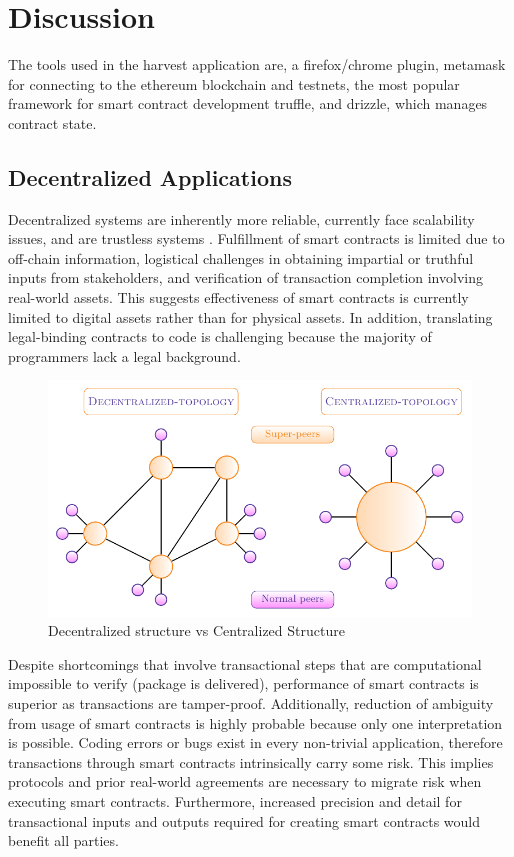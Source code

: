 \documentclass[12pt,tightenlines,letterpaper]{scrartcl}
\begin{document}
\newpage
\section{Discussion}
 	The tools used in the harvest application are, a firefox/chrome plugin, metamask for connecting to the ethereum blockchain and testnets, the most popular framework for smart contract development truffle, and drizzle, which manages contract state.
		\subsection{Decentralized Applications}
		
		
		Decentralized systems are inherently more reliable, currently face scalability issues, and are trustless systems \cite{bitcoinWhitePaper:Online,ethereumWhitePaper:Online}. Fulfillment of smart contracts is limited due to off-chain information, logistical challenges in obtaining impartial or truthful inputs from stakeholders, and verification of transaction completion involving real-world assets. This suggests effectiveness of smart contracts is currently limited to digital assets rather than for physical assets.  In addition, translating legal-binding contracts to code is challenging because the majority of programmers lack a legal background.
		
		\begin{figure}[H]
		\centering
		\includegraphics[width=0.7\linewidth]{DappVApp}
		\caption{Decentralized structure vs Centralized Structure}
		\label{fig:dappvapp}
		\end{figure}
		
		Despite shortcomings that involve transactional steps that are computational impossible to verify (package is delivered), performance of smart contracts is superior as transactions are tamper-proof.
		Additionally, reduction of ambiguity from usage of smart contracts is highly probable because only one interpretation is possible. Coding errors or bugs exist in every non-trivial application, therefore transactions through smart contracts intrinsically carry some risk. This implies protocols and prior real-world agreements are necessary to migrate risk when executing smart contracts. Furthermore, increased precision and detail for transactional inputs and outputs required for creating smart contracts would benefit all parties. 
		
\end{document}
